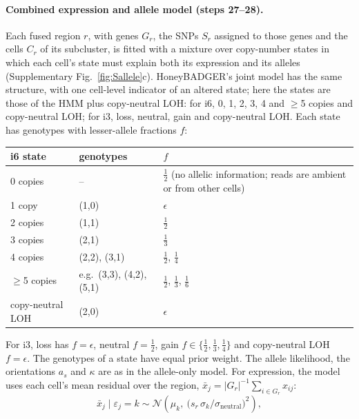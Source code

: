 \paragraph{Combined expression and allele model (steps 27--28).}
Each fused region $r$, with genes $G_r$, the SNPs $S_r$ assigned to those genes and the cells $C_r$ of its subcluster, is fitted with a mixture over copy-number states in which each cell's state must explain both its expression and its alleles (Supplementary Fig.~\ref{fig:Sallele}c). HoneyBADGER's joint model has the same structure, with one cell-level indicator of an altered state; here the states are those of the HMM plus copy-neutral LOH: for i6, 0, 1, 2, 3, 4 and $\geq$5 copies and copy-neutral LOH; for i3, loss, neutral, gain and copy-neutral LOH. Each state has genotypes with lesser-allele fractions $f$:
\begin{center}
\small
\begin{tabular}{lll}
\hline
i6 state & genotypes & $f$\\
\hline
0 copies & -- & $\tfrac12$ (no allelic information; reads are ambient or from other cells)\\
1 copy & (1,0) & $\epsilon$\\
2 copies & (1,1) & $\tfrac12$\\
3 copies & (2,1) & $\tfrac13$\\
4 copies & (2,2), (3,1) & $\tfrac12$, $\tfrac14$\\
$\geq$5 copies & e.g.\ (3,3), (4,2), (5,1) & $\tfrac12$, $\tfrac13$, $\tfrac16$\\
copy-neutral LOH & (2,0) & $\epsilon$\\
\hline
\end{tabular}
\end{center}
For i3, loss has $f=\epsilon$, neutral $f=\tfrac12$, gain $f\in\{\tfrac12,\tfrac13,\tfrac14\}$ and copy-neutral LOH $f=\epsilon$. The genotypes of a state have equal prior weight. The allele likelihood, the orientations $a_s$ and $\kappa$ are as in the allele-only model. For expression, the model uses each cell's mean residual over the region, $\bar x_j = |G_r|^{-1}\sum_{i\in G_r}x_{ij}$:
\begin{equation}
\bar x_j\mid \varepsilon_j=k \sim \mathcal N\!\left(\mu_k,\ \big(s_r\,\sigma_k/\sigma_{\mathrm{neutral}}\big)^2\right),
\end{equation}
